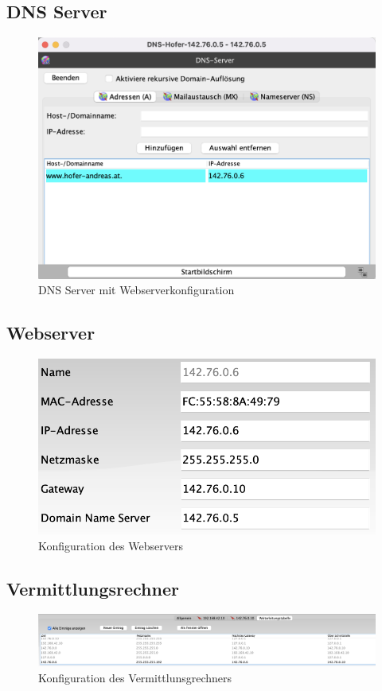 \documentclass{article}
\begin{document}
	\subsection{DNS Server}
	\begin{figure}[H]
	\centering
	\includegraphics[scale=0.5]{3.2.png}
	\caption{DNS Server mit Webserverkonfiguration}
	\end{figure}
	\subsection{Webserver}
	\begin{figure}[H]
	\centering
	\includegraphics[scale=0.5]{3.3.png}
	\caption{Konfiguration des Webservers}
	\end{figure}
	\subsection{Vermittlungsrechner}
	\begin{figure}[H]
	\centering
	\includegraphics[scale=0.4]{3.4.png}
	\caption{Konfiguration des Vermittlunsgrechners}
	\end{figure}
\end{document}
